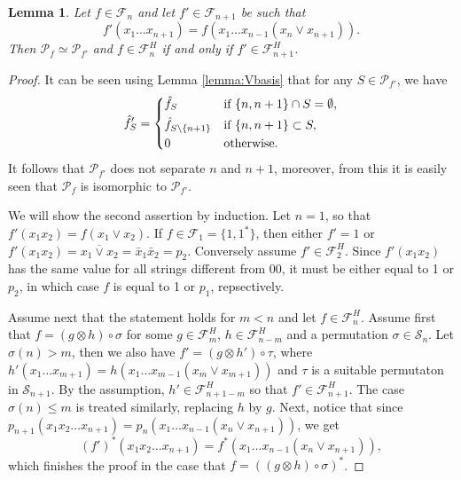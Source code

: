 \documentclass[12pt]{article}
\newtheorem{lemma}{Lemma}
\theoremstyle{definition}
\theoremstyle{remark}
\def\perm{\mathcal S}
\def\Pe{\mathcal P}
\def\Fe{\mathcal F}
\begin{document}
\begin{lemma}\label{lemma:separ} Let $f\in \Fe_n$ and let $f'\in \Fe_{n+1}$
be such that 
\[
f'(x_1\dots x_{n+1})=f(x_1 \dots x_{n-1}(x_n\vee x_{n+1})).
\]
Then $\Pe_f\simeq \Pe_{f'}$ and $f\in \Fe_n^H$ if and only if $f'\in \Fe_{n+1}^H$.

\end{lemma}

\begin{proof}
It can be seen using Lemma \ref{lemma:Vbasis} that for any $S\in \Pe_{f'}$, we have
\[
\hat f'_S =\begin{dcases} \hat f_S & \text{if } \{n,n+1\}\cap S=\emptyset,\\
\hat f_{S\setminus \{n+1\}} & \text{if } \{n,n+1\}\subset S,\\
0 & \text{otherwise}.
\end{dcases}       
\]
It follows that $\Pe_{f'}$ does not separate $n$ and $n+1$, moreover, from this it is
easily seen that   $\Pe_f$ is
isomorphic to $\Pe_{f'}$. 

We will show the second assertion by induction. 
Let $n=1$, so that $f'(x_1x_2)=f(x_1\vee x_2)$. If $f\in \Fe_1=\{1,1^*\}$, then either
$f'=1$ or $f'(x_1x_2)=\overline{x_1\vee x_2}=\bar x_1\bar x_2=p_2$. Conversely assume $f'\in
\Fe_2^H$. Since $f'(x_1x_2)$ has the same value for all strings different from 00, it must
be either equal to 1 or $p_2$, in which case $f$ is equal to 1 or $p_1$, repsectively. 

Assume next that the statement holds for $m<n$ and let $f\in \Fe_n^H$. Assume first that $f=(g\otimes
h)\circ \sigma$ for some $g\in \Fe_m^H$,
$h\in \Fe_{n-m}^H$ and a permutation $\sigma\in \perm_n$.  Let $\sigma(n)> m$,  
then we also have  $f'=(g\otimes h')\circ \tau$, where $h'(x_1\dots x_{m+1}) =h(x_1\dots x_{m-1}(x_m\vee x_{m+1}))$
and $\tau$ is a suitable permutaton in $\perm_{n+1}$. 
By the assumption, $h'\in \Fe_{n+1-m}^H$ so that $f'\in
\Fe_{n+1}^H$. The case $\sigma(n)\le m$ is treated similarly, replacing $h$ by $g$. 
Next, notice that since $p_{n+1}(x_1x_2\dots x_{n+1})=p_n(x_1\dots x_{n-1}(x_n\vee x_{n+1}))$,  we get
\begin{equation}\label{eq:fprime_dual}
(f')^*(x_1x_2\dots x_{n+1})=f^*(x_1\dots x_{n-1}(x_n\vee x_{n+1})),
\end{equation}
which finishes the proof in the case that $f=((g\otimes h)\circ\sigma)^*$. 



\end{proof}
\end{document}
